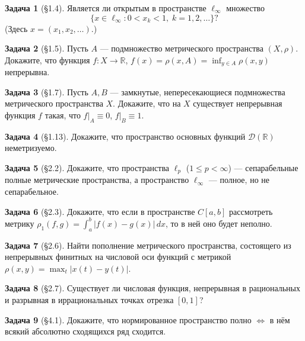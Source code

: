 \documentclass{article}
\theoremstyle{definition}
\newtheorem{problem}{Задача}
\newcommand{\R}{\mathbb R}
\begin{document}
\begin{problem}[\S 1.4]
Является ли открытым в пространстве $\ell_\infty$ множество
\begin{equation*}
\{x\in \ell_\infty : 0< x_k < 1, \; k=1,2,\ldots\}?
\end{equation*}
(Здесь $x=(x_1,x_2, \ldots)$.)
\end{problem}

\begin{problem}[\S 1.5]
Пусть $A$ --- подмножество метрического пространства $(X,\rho)$.
Докажите, что функция $f\colon X\to \R$, $f(x)=\rho(x,A) = \inf_{y\in A} \rho(x,y)$
непрерывна.
\end{problem}

\begin{problem}[\S 1.7]
Пусть $A, B$ --- замкнутые, непересекающиеся подмножества метрического пространства $X$.
Докажите, что на $X$ существует непрерывная функция $f$ такая, что $f|_A \equiv 0$, $f|_B \equiv 1$.
\end{problem}

\begin{problem}[\S 1.13]
Докажите, что пространство основных функций $\mathscr{D}(\R)$ неметризуемо.
\end{problem}

\begin{problem}[\S 2.2]
Докажите, что пространства $\ell_p$ ($1\le p < \infty$) --- сепарабельные полные метрические пространства,
а пространство $\ell_\infty$ --- полное, но не сепарабельное.
\end{problem}

\begin{problem}[\S 2.3]
Докажите, что если в пространстве $C[a,b]$ рассмотреть метрику $\rho_1(f,g)=\int_a^b |f(x) - g(x)|\, dx$,
то в ней оно будет неполно.
\end{problem}

\begin{problem}[\S 2.6]
Найти пополнение метрического пространства, состоящего из непрерывных финитных на числовой оси функций с метрикой $\rho(x,y) = \max_t |x(t) - y(t)|$.
\end{problem}

\begin{problem}[\S 2.7]
Существует ли числовая функция, непрерывная в рациональных и разрывная в иррациональных точках
отрезка $[0,1]$?
\end{problem}

\begin{problem}[\S 4.1]
Докажите, что нормированное пространство полно $\Leftrightarrow$ в нём
всякий абсолютно сходящихся ряд сходится.
\end{problem}
\end{document}
